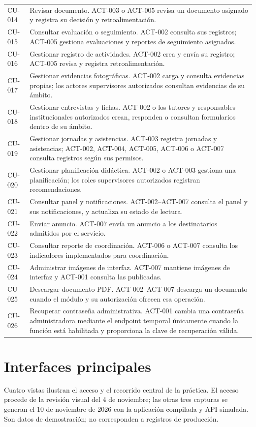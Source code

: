 \documentclass[11pt,a4paper]{article}
\begin{document}
{\begin{longtable}{@{}P{2.2cm}P{12.9cm}@{}}
CU-014 & Revisar documento. ACT-003 o ACT-005 revisa un documento asignado y registra su decisión y retroalimentación.\\
CU-015 & Consultar evaluación o seguimiento. ACT-002 consulta sus registros; ACT-005 gestiona evaluaciones y reportes de seguimiento asignados.\\
CU-016 & Gestionar registro de actividades. ACT-002 crea y envía su registro; ACT-005 revisa y registra retroalimentación.\\
CU-017 & Gestionar evidencias fotográficas. ACT-002 carga y consulta evidencias propias; los actores supervisores autorizados consultan evidencias de su ámbito.\\
CU-018 & Gestionar entrevistas y fichas. ACT-002 o los tutores y responsables institucionales autorizados crean, responden o consultan formularios dentro de su ámbito.\\
CU-019 & Gestionar jornadas y asistencias. ACT-003 registra jornadas y asistencias; ACT-002, ACT-004, ACT-005, ACT-006 o ACT-007 consulta registros según sus permisos.\\
CU-020 & Gestionar planificación didáctica. ACT-002 o ACT-003 gestiona una planificación; los roles supervisores autorizados registran recomendaciones.\\
CU-021 & Consultar panel y notificaciones. ACT-002--ACT-007 consulta el panel y sus notificaciones, y actualiza su estado de lectura.\\
CU-022 & Enviar anuncio. ACT-007 envía un anuncio a los destinatarios admitidos por el servicio.\\
CU-023 & Consultar reporte de coordinación. ACT-006 o ACT-007 consulta los indicadores implementados para coordinación.\\
CU-024 & Administrar imágenes de interfaz. ACT-007 mantiene imágenes de interfaz y ACT-001 consulta las publicadas.\\
CU-025 & Descargar documento PDF. ACT-002--ACT-007 descarga un documento cuando el módulo y su autorización ofrecen esa operación.\\
CU-026 & Recuperar contraseña administrativa. ACT-001 cambia una contraseña administradora mediante el endpoint temporal únicamente cuando la función está habilitada y proporciona la clave de recuperación válida.\\
\end{longtable}
}
\clearpage
\section{Interfaces principales}
Cuatro vistas ilustran el acceso y el recorrido central de la práctica.
El acceso procede de la revisión visual del 4 de noviembre; las otras tres capturas
se generan el 10 de noviembre de 2026 con la aplicación compilada y API simulada.
Son datos de demostración; no corresponden a registros de producción.
\end{document}
